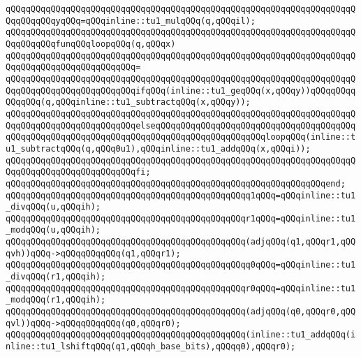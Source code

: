 \verb|qQQqqQQqqQQqqQQqqQQqqQQqqQQqqQQqqQQqqQQqqQQqqQQqqQQqqQQqqQQqqQQqqQQqqQQqqQQqqQQqyqQQq=qQQqinline::tu1_mulqQQq(q,qQQqil);|\newline
\newline
\verb|qQQqqQQqqQQqqQQqqQQqqQQqqQQqqQQqqQQqqQQqqQQqqQQqqQQqqQQqqQQqqQQqqQQqqQQqqQQqqQQqfunqQQqloopqQQq(q,qQQqx)|\newline
\verb|qQQqqQQqqQQqqQQqqQQqqQQqqQQqqQQqqQQqqQQqqQQqqQQqqQQqqQQqqQQqqQQqqQQqqQQqqQQqqQQqqQQqqQQqqQQqqQQq=|\newline
\verb|qQQqqQQqqQQqqQQqqQQqqQQqqQQqqQQqqQQqqQQqqQQqqQQqqQQqqQQqqQQqqQQqqQQqqQQqqQQqqQQqqQQqqQQqqQQqqQQqifqQQq(inline::tu1_geqQQq(x,qQQqy))qQQqqQQqqQQqqQQq(q,qQQqinline::tu1_subtractqQQq(x,qQQqy));|\newline
\verb|qQQqqQQqqQQqqQQqqQQqqQQqqQQqqQQqqQQqqQQqqQQqqQQqqQQqqQQqqQQqqQQqqQQqqQQqqQQqqQQqqQQqqQQqqQQqqQQqelseqQQqqQQqqQQqqQQqqQQqqQQqqQQqqQQqqQQqqQQqqQQqqQQqqQQqqQQqqQQqqQQqqQQqqQQqqQQqqQQqqQQqqQQqqQQqloopqQQq(inline::tu1_subtractqQQq(q,qQQq0u1),qQQqinline::tu1_addqQQq(x,qQQqi));|\newline
\verb|qQQqqQQqqQQqqQQqqQQqqQQqqQQqqQQqqQQqqQQqqQQqqQQqqQQqqQQqqQQqqQQqqQQqqQQqqQQqqQQqqQQqqQQqqQQqqQQqfi;|\newline
\verb|qQQqqQQqqQQqqQQqqQQqqQQqqQQqqQQqqQQqqQQqqQQqqQQqqQQqqQQqqQQqqQQqend;|\newline
\newline
\verb|qQQqqQQqqQQqqQQqqQQqqQQqqQQqqQQqqQQqqQQqqQQqqQQqq1qQQq=qQQqinline::tu1_divqQQq(u,qQQqih);|\newline
\verb|qQQqqQQqqQQqqQQqqQQqqQQqqQQqqQQqqQQqqQQqqQQqqQQqr1qQQq=qQQqinline::tu1_modqQQq(u,qQQqih);|\newline
\newline
\verb|qQQqqQQqqQQqqQQqqQQqqQQqqQQqqQQqqQQqqQQqqQQqqQQq(adjqQQq(q1,qQQqr1,qQQqvh))qQQq->qQQqqQQqqQQq(q1,qQQqr1);|\newline
\newline
\verb|qQQqqQQqqQQqqQQqqQQqqQQqqQQqqQQqqQQqqQQqqQQqqQQqq0qQQq=qQQqinline::tu1_divqQQq(r1,qQQqih);|\newline
\verb|qQQqqQQqqQQqqQQqqQQqqQQqqQQqqQQqqQQqqQQqqQQqqQQqr0qQQq=qQQqinline::tu1_modqQQq(r1,qQQqih);|\newline
\newline
\verb|qQQqqQQqqQQqqQQqqQQqqQQqqQQqqQQqqQQqqQQqqQQqqQQq(adjqQQq(q0,qQQqr0,qQQqvl))qQQq->qQQqqQQqqQQq(q0,qQQqr0);|\newline
\newline
\verb|qQQqqQQqqQQqqQQqqQQqqQQqqQQqqQQqqQQqqQQqqQQqqQQq(inline::tu1_addqQQq(inline::tu1_lshiftqQQq(q1,qQQqh_base_bits),qQQqq0),qQQqr0);|\newline

